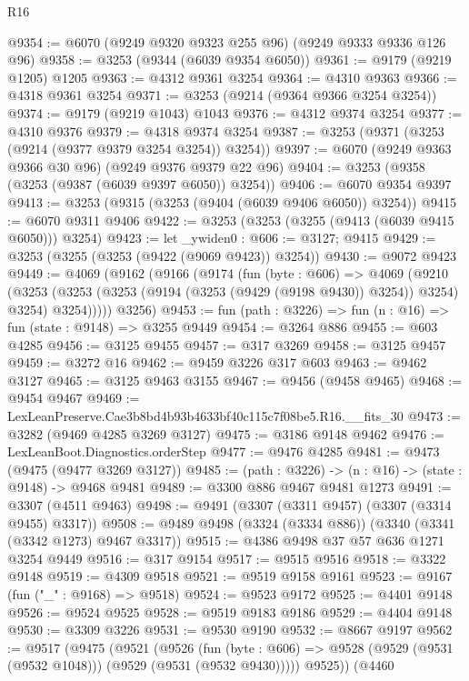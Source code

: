 \begin{lexlean}{R16}
\begin{coremodule}
@9354 := @6070 (@9249 @9320 @9323 @255 @96) (@9249 @9333 @9336 @126 @96)
@9358 := @3253 (@9344 (@6039 @9354 @6050))
@9361 := @9179 (@9219 @1205) @1205
@9363 := @4312 @9361 @3254
@9364 := @4310 @9363
@9366 := @4318 @9361 @3254
@9371 := @3253 (@9214 (@9364 @9366 @3254 @3254))
@9374 := @9179 (@9219 @1043) @1043
@9376 := @4312 @9374 @3254
@9377 := @4310 @9376
@9379 := @4318 @9374 @3254
@9387 := @3253 (@9371 (@3253 (@9214 (@9377 @9379 @3254 @3254)) @3254))
@9397 := @6070 (@9249 @9363 @9366 @30 @96) (@9249 @9376 @9379 @22 @96)
@9404 := @3253 (@9358 (@3253 (@9387 (@6039 @9397 @6050)) @3254))
@9406 := @6070 @9354 @9397
@9413 := @3253 (@9315 (@3253 (@9404 (@6039 @9406 @6050)) @3254))
@9415 := @6070 @9311 @9406
@9422 := @3253 (@3253 (@3255 (@9413 (@6039 @9415 @6050))) @3254)
@9423 := let _ywiden0 : @606 := @3127; @9415
@9429 := @3253 (@3255 (@3253 (@9422 (@9069 @9423)) @3254))
@9430 := @9072 @9423
@9449 := @4069
    (@9162
      (@9166
        (@9174
          (fun (byte : @606) =>
          @4069
            (@9210
              (@3253
                (@3253 (@3253 (@9194 (@3253 (@9429 (@9198 @9430)) @3254)) @3254) @3254)
                @3254)))))
      @3256)
@9453 := fun (path : @3226) => fun (n : @16) => fun (state : @9148) => @3255 @9449
@9454 := @3264 @886
@9455 := @603 @4285
@9456 := @3125 @9455
@9457 := @317 @3269
@9458 := @3125 @9457
@9459 := @3272 @16
@9462 := @9459 @3226 @317 @603
@9463 := @9462 @3127
@9465 := @3125 @9463 @3155
@9467 := @9456 (@9458 @9465)
@9468 := @9454 @9467
@9469 := LexLeanPreserve.Cae3b8bd4b93b4633bf40c115c7f08be5.R16.__fits_30
@9473 := @3282 (@9469 @4285 @3269 @3127)
@9475 := @3186 @9148 @9462
@9476 := LexLeanBoot.Diagnostics.orderStep
@9477 := @9476 @4285
@9481 := @9473 (@9475 (@9477 @3269 @3127))
@9485 := (path : @3226) -> (n : @16) -> (state : @9148) -> @9468 @9481
@9489 := @3300 @886 @9467 @9481 @1273
@9491 := @3307 (@4511 @9463)
@9498 := @9491 (@3307 (@3311 @9457) (@3307 (@3314 @9455) @3317))
@9508 := @9489 @9498 (@3324 (@3334 @886)) (@3340 (@3341 (@3342 @1273) @9467 @3317))
@9515 := @4386 @9498 @37 @57 @636 @1271 @3254 @9449
@9516 := @317 @9154
@9517 := @9515 @9516
@9518 := @3322 @9148
@9519 := @4309 @9518
@9521 := @9519 @9158 @9161
@9523 := @9167 (fun ("_" : @9168) => @9518)
@9524 := @9523 @9172
@9525 := @4401 @9148
@9526 := @9524 @9525
@9528 := @9519 @9183 @9186
@9529 := @4404 @9148
@9530 := @3309 @3226
@9531 := @9530 @9190
@9532 := @8667 @9197
@9562 := @9517
    (@9475
      (@9521
        (@9526
          (fun (byte : @606) => @9528 (@9529 (@9531 (@9532 @1048))) (@9529 (@9531 (@9532 @9430)))))
        @9525))
    (@4460

\end{coremodule}
\end{lexlean}
